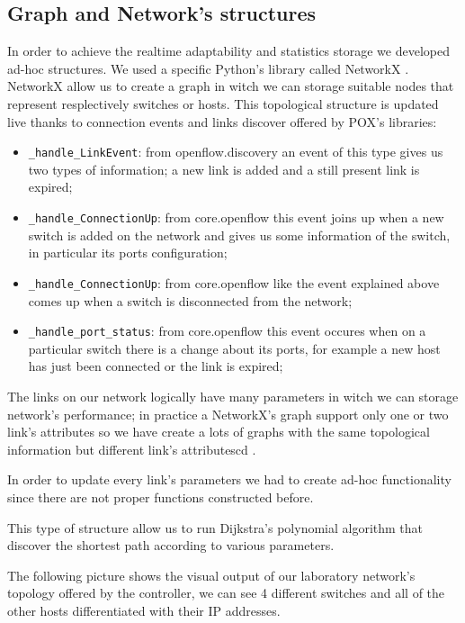 \documentclass[article,10pt]{IEEEtran}
\begin{document}
\subsection{Graph and Network's structures}
  In order to achieve the realtime adaptability and statistics storage we developed ad-hoc structures.
  We used a specific Python's library called NetworkX \cite{networkx}. NetworkX allow us to create a graph in witch we can storage suitable nodes
  that represent resplectively switches or hosts.
  This topological structure is updated live thanks to connection events and links discover offered by POX's libraries:
  \begin{itemize}
   \item \texttt{_handle_LinkEvent}: from openflow.discovery an event of this type gives us two types of information; a new link is added and 
   a still present link is expired;
   \item \texttt{_handle_ConnectionUp}: from core.openflow this event joins up when a new switch is added on the network and gives us
   some information of the switch, in particular its ports configuration;
   \item \texttt{_handle_ConnectionUp}: from core.openflow like the event explained above comes up when a switch is disconnected from the network;
   \item \texttt{_handle_port_status}: from core.openflow this event occures when on a particular switch there is a change about its ports, for example
   a new host has just been connected or the link is expired;\\
  \end{itemize}

  
  The links on our network logically have many parameters in witch we can storage network's performance; in practice a NetworkX's graph support only 
  one or two link's attributes so we have create a lots of graphs with the same topological information but different link's attributescd .
  
  In order to update every link's parameters we had to create ad-hoc functionality
  since there are not proper functions constructed before.
  
  This type of structure allow us to run Dijkstra's polynomial algorithm that discover the shortest path according to various parameters.
  
  The following picture shows the visual output of our laboratory network's topology offered by the controller, we can see 4 different switches and all of the other hosts
  differentiated with their IP addresses.
  
\end{document}

